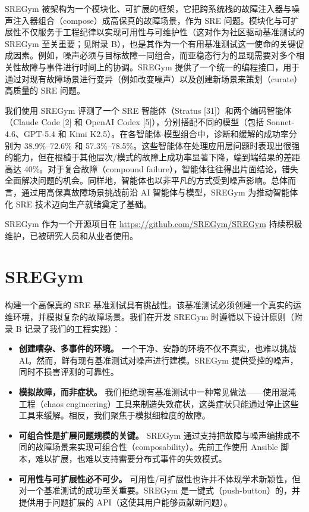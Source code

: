 \documentclass[11pt,UTF8,fontset=fandol]{ctexart}
\begin{document}
SREGym 被架构为一个模块化、可扩展的框架，它把跨系统栈的故障注入器与噪声注入器组合（compose）成高保真的故障场景，作为 SRE 问题。模块化与可扩展性不仅服务于工程纪律以实现可用性与可维护性（这对作为社区驱动基准测试的 SREGym 至关重要；见附录 B），也是其作为一个有用基准测试这一使命的关键促成因素。例如，噪声必须与目标故障一同组合，而亚稳态行为的显现需要对多个相关性故障与事件进行时间上的协调。SREGym 提供了一个统一的编程接口，用于通过对现有故障场景进行变异（例如改变噪声）以及创建新场景来策划（curate）高质量的 SRE 问题。

我们使用 SREGym 评测了一个 SRE 智能体（Stratus [31]）和两个编码智能体（Claude Code [2] 和 OpenAI Codex [5]），分别搭配不同的模型（包括 Sonnet-4.6、GPT-5.4 和 Kimi K2.5）。在各智能体-模型组合中，诊断和缓解的成功率分别为 38.9\%--72.6\% 和 57.3\%--78.5\%。这些智能体在处理应用层问题时表现出很强的能力，但在根植于其他层次/模式的故障上成功率显著下降，端到端结果的差距高达 40\%。对于复合故障（compound failure），智能体往往得出片面结论，错失全面解决问题的机会。同样地，智能体也以非平凡的方式受到噪声影响。总体而言，通过用高保真故障场景挑战前沿 AI 智能体与模型，SREGym 为推动智能体化 SRE 技术迈向生产就绪奠定了基础。

SREGym 作为一个开源项目在 \url{https://github.com/SREGym/SREGym} 持续积极维护，已被研究人员和从业者使用。

\section{SREGym}

构建一个高保真的 SRE 基准测试具有挑战性。该基准测试必须创建一个真实的运维环境，并模拟复杂的故障场景。我们在开发 SREGym 时遵循以下设计原则（附录 B 记录了我们的工程实践）：

\begin{itemize}[leftmargin=1.5em]
\item \textbf{创建嘈杂、多事件的环境。} 一个干净、安静的环境不仅不真实，也难以挑战 AI。然而，鲜有现有基准测试对噪声进行建模。SREGym 提供受控的噪声，同时不损害评测的可靠性。
\item \textbf{模拟故障，而非症状。} 我们拒绝现有基准测试中一种常见做法——使用混沌工程（chaos engineering）工具来制造失效症状，这类症状只能通过停止这些工具来缓解。相反，我们聚焦于模拟细粒度的故障。
\item \textbf{可组合性是扩展问题规模的关键。} SREGym 通过支持把故障与噪声编排成不同的故障场景来实现可组合性（composability）。先前工作使用 Ansible 脚本，难以扩展，也难以支持需要分布式事件的失效模式。
\item \textbf{可用性与可扩展性必不可少。} 可用性/可扩展性也许并不体现学术新颖性，但对一个基准测试的成功至关重要。SREGym 是一键式（push-button）的，并提供用于问题扩展的 API（这使其用户能够贡献新问题）。
\end{itemize}
\end{document}
